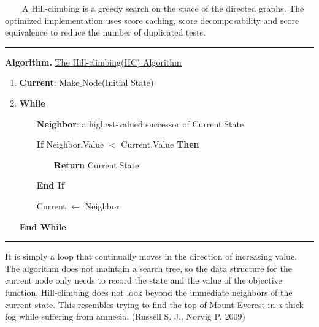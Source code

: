 ~~~~A Hill-climbing is a greedy search on the space of the directed graphs. The optimized implementation uses score caching, score decomposability and score equivalence to reduce the number of duplicated tests.

\begin{center}\rule[0.5ex]{0.9\columnwidth}{1pt}\end{center}

\textbf{Algorithm.} \underline{The Hill-climbing(HC) Algorithm}

\begin{enumerate}
	\item \textbf{Current}: Make$\_$Node(Initial State)
	
	\item \textbf{While}
	
	~~~~\textbf{Neighbor}: a highest-valued successor of Current.State
	
	~~~~\textbf{If} Neighbor.Value $<$ Current.Value \textbf{Then}
	
	~~~~~~~~\textbf{Return} Current.State
	
	~~~~\textbf{End If}
	
	~~~~Current $\leftarrow$ Neighbor
	
	\textbf{End While}
\end{enumerate}

\begin{center}\rule[0.5ex]{0.9\columnwidth}{1pt}\end{center}

It is simply a loop that continually moves in the direction of increasing value. The algorithm does not maintain a search tree, so the data structure for the current node only needs to record the state and the value of the objective function. Hill-climbing does not look beyond the immediate neighbors of the current state. This resembles trying to find the top of Mount Everest in a thick fog while suffering from amnesia. (Russell S. J., Norvig P. 2009)